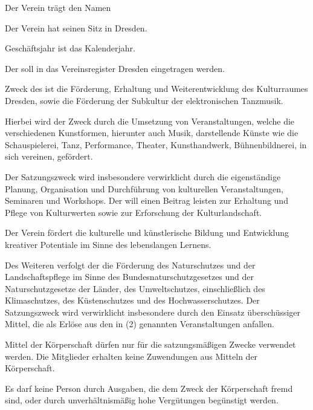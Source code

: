 \begin{contract}


    Der Verein trägt den Namen \name

    Der Verein hat seinen Sitz in Dresden.

    Geschäftsjahr ist das Kalenderjahr.

    Der \name soll in das Vereinsregister Dresden eingetragen werden.


    \label{clause:vereinszweck}

    Zweck des \name ist die Förderung, Erhaltung und Weiterentwicklung
    des Kulturraumes Dresden, sowie die Förderung der Subkultur der elektronischen Tanzmusik.

    Hierbei wird der Zweck durch die Umsetzung von Veranstaltungen, welche die verschiedenen Kunstformen, hierunter auch Musik, darstellende Künste wie die Schauspielerei, Tanz, Performance, Theater, Kunsthandwerk, Bühnenbildnerei, in sich vereinen, gefördert.

    Der Satzungszweck wird insbesondere verwirklicht durch die eigenständige Planung, Organisation und Durchführung von kulturellen Veranstaltungen, Seminaren und Workshops. Der \name will einen Beitrag leisten zur Erhaltung und Pflege von Kulturwerten sowie zur Erforschung der Kulturlandschaft.

    Der Verein fördert die kulturelle und künstlerische Bildung und Entwicklung kreativer Potentiale im Sinne des lebenslangen Lernens.

    Des Weiteren verfolgt der \name die Förderung des Naturschutzes und der Landschaftspflege im Sinne des Bundesnaturschutzgesetzes und der Naturschutzgesetze der Länder, des Umweltschutzes, einschließlich des Klimaschutzes, des Küstenschutzes und des Hochwasserschutzes.
    Der Satzungszweck wird verwirklicht insbesondere durch den Einsatz überschüssiger Mittel, die als Erlöse aus den in (2) genannten Veranstaltungen anfallen.

    Mittel der Körperschaft dürfen nur für die satzungsmäßigen Zwecke verwendet werden. Die Mitglieder erhalten keine Zuwendungen aus Mitteln der Körperschaft.

    Es darf keine Person durch Ausgaben, die dem Zweck der Körperschaft fremd sind, oder durch unverhältnismäßig hohe Vergütungen begünstigt werden.

\end{contract}

